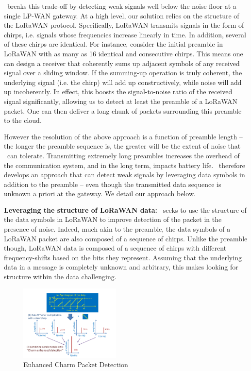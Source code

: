 \name\ breaks this trade-off by detecting weak signals well below the noise floor at a single LP-WAN gateway. At a high level, our solution relies on the structure of the LoRaWAN protocol. Specifically, LoRaWAN transmits signals in the form of chirps, i.e. signals whose frequencies increase linearly in time. In addition, several of these chirps are identical. For instance, consider the initial preamble  in LoRaWAN with as many as 16 identical and consecutive chirps. This means one can design a receiver that coherently sums up adjacent symbols of any received signal over a sliding window. If the summing-up operation is truly coherent, the underlying signal (i.e. the chirp) will add up constructively, while noise will add up incoherently. In effect, this boosts the signal-to-noise ratio of the received signal significantly, allowing us to detect at least the preamble of a LoRaWAN packet. One can then deliver a long chunk of packets surrounding this preamble to the cloud. 

However the resolution of the above approach is a function of preamble length -- the longer the preamble sequence is, the greater will be the extent of noise that \name\ can tolerate. Transmitting extremely long preambles increases the overhead of the communication system, and in the long term, impacts battery life. \name\ therefore develops an approach that can detect weak signals by leveraging data symbols in addition to the preamble -- even though the transmitted data sequence is unknown a priori at the gateway. We detail our approach below. \vspace*{0.1in}

\noindent \textbf{Leveraging the structure of LoRaWAN data: } \name\ seeks to use the structure of the data symbols in LoRaWAN to improve detection of the packet in the presence of noise. Indeed, much akin to the preamble, the data symbols of a LoRaWAN packet are also composed of a sequence of chirps. Unlike the preamble though, LoRaWAN data is composed of a sequence of chirps with different frequency-shifts based on the bits they represent. Assuming that the underlying data in a message is completely unknown and arbitrary, this makes looking for structure within the data challenging. 


\begin{figure}
    \centering
    \includegraphics[width=0.45\textwidth]{location-aware-network/figures/CharmEnhancedDetection.pdf}
        \vspace*{-0.1in}
    \caption{Enhanced Charm Packet Detection}
    \label{fig:enhanced_charm}
    \compactimg
\end{figure}


